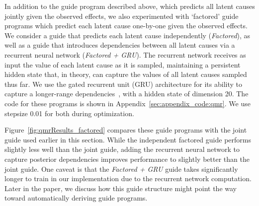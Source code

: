 In addition to the guide program described above, which predicts all latent causes jointly given the observed effects, we also experimented with `factored' guide programs which predict each latent cause one-by-one given the observed effects. We consider a guide that predicts each latent cause independently (\emph{Factored}), as well as a guide that introduces dependencies between all latent causes via a recurrent neural network (\emph{Factored + GRU}). The recurrent network receives as input the value of each latent cause as it is sampled, maintaining a persistent hidden state  that, in theory, can capture the values of all latent causes sampled thus far. We use the gated recurrent unit (GRU) architecture for its ability to capture a longer-range dependencies~\cite{GRU}, with a hidden state of dimension 20. The code for these programs is shown in Appendix~\ref{sec:appendix_code:qmr}.
We use stepsize 0.01 for both during optimization.

Figure~\ref{fig:qmrResults_factored} compares these guide programs with the joint guide used earlier in this section.
While the independent factored guide performs slightly less well than the joint guide, adding the recurrent neural network to capture posterior dependencies improves performance to slightly better than the joint guide.
One caveat is that the \emph{Factored + GRU} guide takes significantly longer to train in our implementation due to the recurrent network computation.
Later in the paper, we discuss how this guide structure might point the way toward automatically deriving guide programs.

